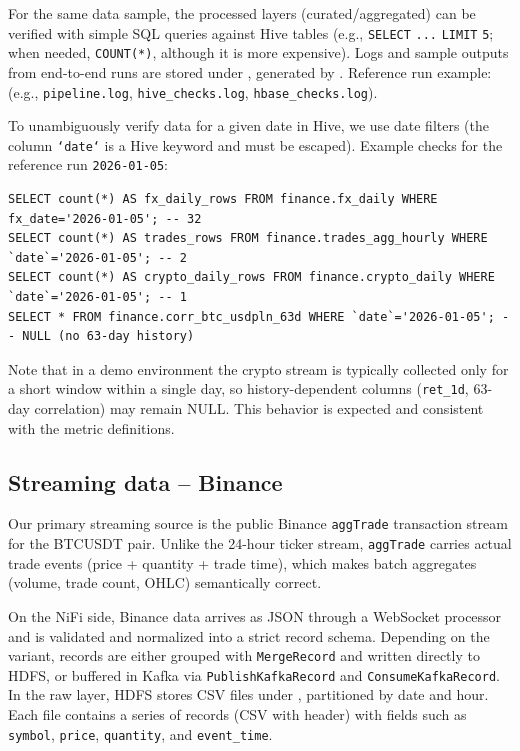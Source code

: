 \documentclass{article}
\begin{document}
For the same data sample, the processed layers (curated/aggregated) can
be verified with simple SQL queries against Hive tables (e.g.,
\texttt{SELECT} \texttt{...} \texttt{LIMIT} \texttt{5}; when needed,
\texttt{COUNT(*)}, although it is more expensive). Logs and sample
outputs from end-to-end runs are stored under
, generated by
. Reference run example:
 (e.g.,
\texttt{pipeline.log}, \texttt{hive\_checks.log},
\texttt{hbase\_checks.log}).

To unambiguously verify data for a given date in Hive, we use date
filters (the column \texttt{`date`} is a Hive keyword and must be
escaped). Example checks for the reference run \texttt{2026-01-05}:

\begin{lstlisting}
SELECT count(*) AS fx_daily_rows FROM finance.fx_daily WHERE fx_date='2026-01-05'; -- 32
SELECT count(*) AS trades_rows FROM finance.trades_agg_hourly WHERE `date`='2026-01-05'; -- 2
SELECT count(*) AS crypto_daily_rows FROM finance.crypto_daily WHERE `date`='2026-01-05'; -- 1
SELECT * FROM finance.corr_btc_usdpln_63d WHERE `date`='2026-01-05'; -- NULL (no 63-day history)
\end{lstlisting}

Note that in a demo environment the crypto stream is typically collected
only for a short window within a single day, so history-dependent columns
(\texttt{ret\_1d}, 63-day correlation) may remain NULL. This behavior is
expected and consistent with the metric definitions.

\subsection{Streaming data -- Binance}

Our primary streaming source is the public Binance \texttt{aggTrade}
transaction stream for the BTCUSDT pair. Unlike the 24-hour ticker
stream, \texttt{aggTrade} carries actual trade events (price + quantity +
trade time), which makes batch aggregates (volume, trade count, OHLC)
semantically correct.

On the NiFi side, Binance data arrives as JSON through a WebSocket
processor and is validated and normalized into a strict record schema.
Depending on the variant, records are either grouped with
\texttt{MergeRecord} and written directly to HDFS, or buffered in Kafka
via \texttt{PublishKafkaRecord} and \texttt{ConsumeKafkaRecord}. In the
raw layer, HDFS stores CSV files under
,
partitioned by date and hour. Each file contains a series of records
(CSV with header) with fields such as \texttt{symbol}, \texttt{price},
\texttt{quantity}, and \texttt{event\_time}.
\end{document}
